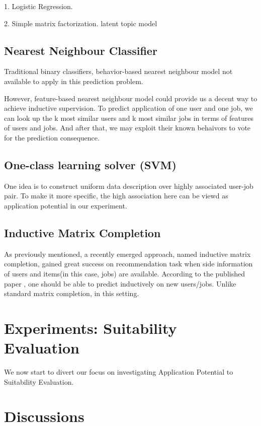 \documentclass{article} %
\begin{document}
1. Logistic Regression.

2. Simple matrix factorization. latent topic model 

\subsection{Nearest Neighbour Classifier} %
Traditional binary classifiers, behavior-based nearest neighbour model
not available to apply in this prediction problem.

However, feature-based nearest neighbour model could provide us a decent way
to achieve inductive supervision. To predict application of one user and one
job, we can look up the k most similar users and k most similar jobs in terms
of features of users and jobs. And after that, we may exploit their known
behaivors to vote for the prediction consequence.

\subsection{One-class learning solver (SVM)} %
One idea is to construct uniform data description over highly associated
user-job pair. To make it more specific, the high association here can be
viewd as application potential in our experiment.

\subsection{Inductive Matrix Completion} %
As previously mentioned, a recently emerged approach, named inductive matrix
completion, gained great success on recommendation task when side information
of users and items(in this case, jobs) are available. According to the
published paper \cite{jain2013provable}, one should be able to predict
inductively on new users/jobs. Unlike standard matrix
completion, in this setting.



\section{Experiments: Suitability Evaluation}
We now start to divert our focus on investigating Application Potential to
Suitability Evaluation.

\section{Discussions}

{}

\end{document}
